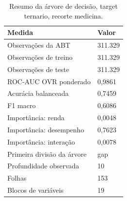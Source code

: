 \begin{table}
\caption{Resumo da árvore de decisão, target ternario, recorte medicina.}
\label{tab:tabela_treeClassification_ternario_recorte_medicina_principal_in_sample_e5}
\begin{tabular}{ll}
\toprule
Medida & Valor \\
\midrule
Observações da ABT & 311.329 \\
Observações de treino & 311.329 \\
Observações de teste & 311.329 \\
ROC-AUC OVR ponderado & 0,9861 \\
Acurácia balanceada & 0,7459 \\
F1 macro & 0,6086 \\
Importância: renda & 0,0048 \\
Importância: desempenho & 0,7623 \\
Importância: interação & 0,0078 \\
Primeira divisão da árvore & gap \\
Profundidade observada & 10 \\
Folhas & 153 \\
Blocos de variáveis & 19 \\
\bottomrule
\end{tabular}
\end{table}
